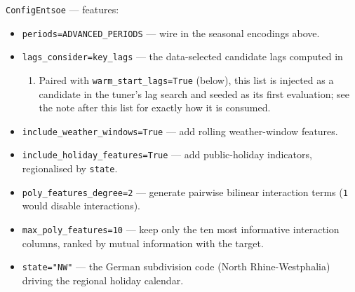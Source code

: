 \documentclass[
  english,
  letterpaper,
]{scrbook}
\providecommand{\tightlist}{%
  \setlength{\itemsep}{0pt}\setlength{\parskip}{0pt}}
\begin{document}
\texttt{ConfigEntsoe} --- features:

\begin{itemize}
\tightlist
\item
  \texttt{periods=ADVANCED\_PERIODS} --- wire in the seasonal encodings
  above.
\item
  \texttt{lags\_consider=key\_lags} --- the data-selected candidate lags
  computed in

  \begin{enumerate}
  \def\labelenumi{\arabic{enumi}.}
  \tightlist
  \item
    Paired with \texttt{warm\_start\_lags=True} (below), this list is
    injected as a candidate in the tuner's lag search and seeded as its
    first evaluation; see the note after this list for exactly how it is
    consumed.
  \end{enumerate}
\item
  \texttt{include\_weather\_windows=True} --- add rolling weather-window
  features.
\item
  \texttt{include\_holiday\_features=True} --- add public-holiday
  indicators, regionalised by \texttt{state}.
\item
  \texttt{poly\_features\_degree=2} --- generate pairwise bilinear
  interaction terms (\texttt{1} would disable interactions).
\item
  \texttt{max\_poly\_features=10} --- keep only the ten most informative
  interaction columns, ranked by mutual information with the target.
\item
  \texttt{state="NW"} --- the German subdivision code (North
  Rhine-Westphalia) driving the regional holiday calendar.
\end{itemize}
\end{document}
